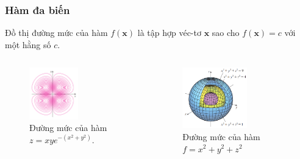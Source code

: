 \begin{frame}
\frametitle{Hàm đa biến}
Đồ thị đường mức của hàm \(f(\mathbf x)\) là tập hợp véc-tơ \(\mathbf x\) sao cho \(f(\mathbf x)=c\) với một hằng số \(c\).
\begin{columns}
\begin{figure}
    \centering
    \includegraphics[width=0.53\textwidth]{Content/Figure/contour2d.png}
    \caption{Đường mức của hàm \(z=xy e^{-(x^2+y^2)}\).}
\end{figure}
\begin{figure}
    \centering
    \includegraphics[width=0.61\textwidth]{Content/Figure/contour3d.png}
    \caption{Đường mức của hàm \(f=x^2+y^2+z^2\)}
\end{figure}
\end{columns}
\end{frame}

